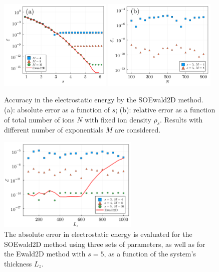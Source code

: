 \begin{figure}[ht]
	\centering
	\includegraphics[width=0.48\textwidth]{figs/fig_error_fixn.pdf}
	\includegraphics[width=0.48\textwidth]{figs/fig_error_N.pdf}
	\caption{
		Accuracy in the electrostatic energy by the SOEwald2D method. (a): absolute error as a function of $s$; (b): relative error as a function of total number of ions $N$ with fixed ion density $\rho_{s}$. Results with different number of exponentials $M$ are considered. 
	}
	\label{fig:error_fixn}
\end{figure}

\begin{figure}[ht]
	\centering
	\includegraphics[width=0.6\textwidth]{figs/fig_error_Lz.pdf} 
	\caption{
		The absolute error in electrostatic energy is evaluated for the SOEwald2D method using three sets of parameters, as well as for the Ewald2D method with $s=5$, as a function of the system's thickness $L_z$. 
	}
	\label{fig:error_Lz}
\end{figure}

